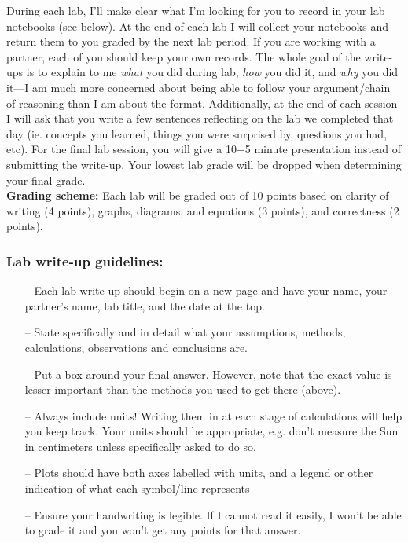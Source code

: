 \documentclass[10pt]{article}
\begin{document}
\noindent During each lab, I'll make clear what I'm looking for you to record in your lab notebooks (see below). At the end of each lab I will collect your notebooks and return them to you graded by the next lab period. If you are working with a partner, each of you should keep your own records. The whole goal of the write-ups is to explain to me \textit{what} you did during lab, \textit{how} you did
it, and \textit{why} you did it---I am much more concerned about being able to follow your argument/chain of reasoning than I am about the format. Additionally, at the end of each session I will ask that you write a few sentences reflecting on the lab we completed that day (ie. concepts you learned, things you were surprised by, questions you had, etc). For the final lab session, you will give a 10+5 minute presentation instead of submitting the write-up. Your lowest lab grade will be dropped when determining your final grade. \\

\noindent \textbf{Grading scheme:} Each lab will be graded out of 10 points based on clarity of writing (4 points), graphs, diagrams, and equations (3 points), and correctness (2 points).

\subsubsection*{Lab write-up guidelines:}
 
\begin{itemize}
\setlength\parskip{0em}
\item[--] Each lab write-up should begin on a new page and have your name, your partner's name, lab title, and the date at the top.
\item[--] State specifically and in detail what your assumptions, methods, calculations, observations and conclusions are.
\item[--] Put a box around your final answer. However, note that the exact value is lesser important than the methods you used to get there (above).
\item[--] Always include units! Writing them in at each stage of calculations will help you keep track. Your units should be appropriate, e.g. don't measure the Sun in centimeters unless specifically asked to do so.
\item[--] Plots should have both axes labelled with units, and a legend or other indication of what each symbol/line represents
\item[--] Ensure your handwriting is legible. If I cannot read it easily, I won't be able to grade it and you won't get any points for that answer.
\end{itemize}
 
\end{document}
